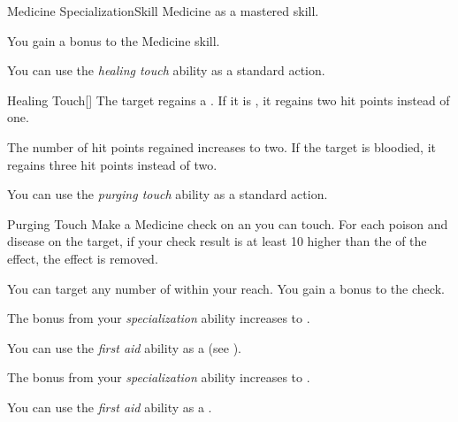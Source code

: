     \begin{feat}{Medicine Specialization}{Skill}
        \featpre Medicine as a mastered skill.

         You gain a  bonus to the Medicine skill.

         You can use the \textit{healing touch} ability as a standard action.
        \begin{freeability}{Healing Touch}[]
            The target regains a .
            If it is , it regains two hit points instead of one.

            \rankline
             The number of hit points regained increases to two.
             If the target is bloodied, it regains three hit points instead of two.
        \end{freeability}

         You can use the \textit{purging touch} ability as a standard action.
        \begin{freeability}{Purging Touch}
            Make a Medicine check on an  you can touch.
            For each poison and disease on the target, if your check result is at least 10 higher than the  of the effect, the effect is removed.

            \rankline
             You can target any number of  within your reach.
             You gain a  bonus to the check.
        \end{freeability}

         The bonus from your \textit{specialization} ability increases to .

         You can use the \textit{first aid} ability as a  (see ).

         The bonus from your \textit{specialization} ability increases to .

         You can use the \textit{first aid} ability as a .
    \end{feat}

